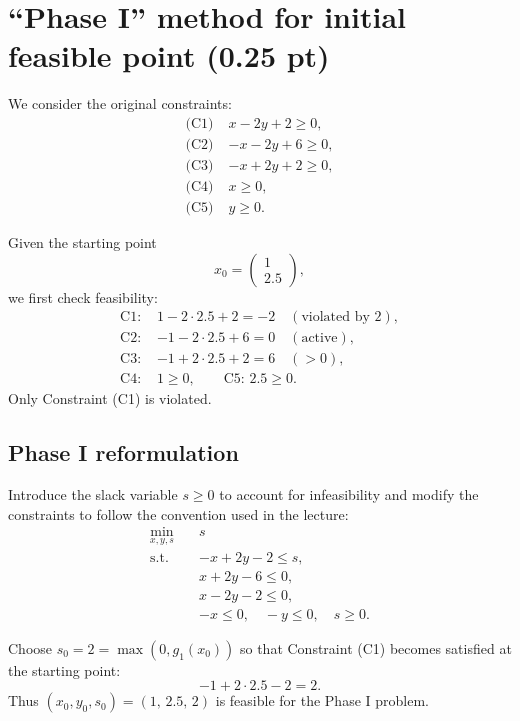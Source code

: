 \documentclass[11pt]{article}
\begin{document}
\section*{“Phase I” method for initial feasible point (0.25 pt)}

We consider the original constraints:
\[
\begin{aligned}
\text{(C1)}\;& x - 2y + 2 \ge 0,\\
\text{(C2)}\;& -x - 2y + 6 \ge 0,\\
\text{(C3)}\;& -x + 2y + 2 \ge 0,\\
\text{(C4)}\;& x \ge 0,\\
\text{(C5)}\;& y \ge 0.
\end{aligned}
\]

Given the starting point
\[
x_{0} = \begin{pmatrix}1\\[0.2em]2.5\end{pmatrix},
\]
we first check feasibility:
\[
\begin{aligned}
\text{C1: } &1 - 2\cdot 2.5 + 2 = -2 \quad (\text{violated by }2),\\
\text{C2: } &-1 - 2\cdot 2.5 + 6 = 0 \quad (\text{active}),\\
\text{C3: } &-1 + 2\cdot 2.5 + 2 = 6 \quad (>0),\\
\text{C4: } &1 \ge 0,\qquad
\text{C5: } 2.5 \ge 0.
\end{aligned}
\]
Only Constraint (C1) is violated.

\subsection*{Phase I reformulation}

Introduce the slack variable \(s \ge 0\) to account for infeasibility and modify the constraints to follow the convention used in the lecture:
\[
\begin{aligned}
\min_{x,y,s}\quad & s\\[0.3em]
\text{s.t.}\quad
& -x + 2y - 2 \le s,\\
& x + 2y - 6 \le 0,\\
& x - 2y - 2 \le 0,\\
& -x \le 0,\quad -y \le 0,\quad s \ge 0.
\end{aligned}
\]

Choose \(s_{0} = 2 = \max(0, g_1(x_{0}))\) so that Constraint (C1) becomes satisfied at the starting point:
\[
-1 + 2\cdot 2.5 - 2 = 2.
\]
Thus \((x_{0}, y_{0}, s_{0}) = (1,\, 2.5,\, 2)\) is feasible for the Phase I problem.
\end{document}
